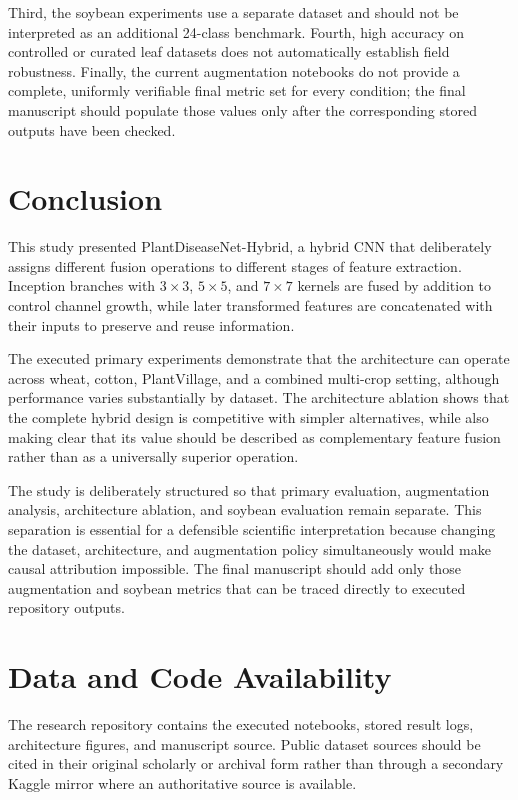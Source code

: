 \documentclass[a4paper,fleqn]{cas-dc}
\begin{document}
Third, the soybean experiments use a separate dataset and should not be interpreted as an additional 24-class benchmark. Fourth, high accuracy on controlled or curated leaf datasets does not automatically establish field robustness. Finally, the current augmentation notebooks do not provide a complete, uniformly verifiable final metric set for every condition; the final manuscript should populate those values only after the corresponding stored outputs have been checked.

\section{Conclusion}
This study presented PlantDiseaseNet-Hybrid, a hybrid CNN that deliberately assigns different fusion operations to different stages of feature extraction. Inception branches with $3\times3$, $5\times5$, and $7\times7$ kernels are fused by addition to control channel growth, while later transformed features are concatenated with their inputs to preserve and reuse information.

The executed primary experiments demonstrate that the architecture can operate across wheat, cotton, PlantVillage, and a combined multi-crop setting, although performance varies substantially by dataset. The architecture ablation shows that the complete hybrid design is competitive with simpler alternatives, while also making clear that its value should be described as complementary feature fusion rather than as a universally superior operation.

The study is deliberately structured so that primary evaluation, augmentation analysis, architecture ablation, and soybean evaluation remain separate. This separation is essential for a defensible scientific interpretation because changing the dataset, architecture, and augmentation policy simultaneously would make causal attribution impossible. The final manuscript should add only those augmentation and soybean metrics that can be traced directly to executed repository outputs.

\section*{Data and Code Availability}
The research repository contains the executed notebooks, stored result logs, architecture figures, and manuscript source. Public dataset sources should be cited in their original scholarly or archival form rather than through a secondary Kaggle mirror where an authoritative source is available.
\end{document}
